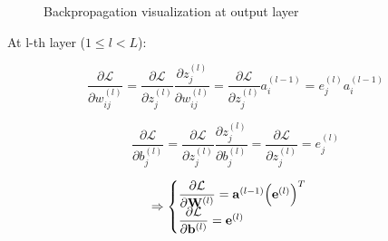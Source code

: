 \documentclass[14pt, a4paper]{article}
\numberwithin{equation}{section}
\numberwithin{algorithm}{section}
\numberwithin{figure}{section}
\begin{document}
\begin{figure}[h!]
{
  }
  \caption{Backpropagation visualization at output layer}
\end{figure}

At l-th layer ($1 \leq l < L$):

\begin{equation}
	\dfrac{\partial \mathcal{L}}{\partial w_{ij}^{(l)}}=\dfrac{\partial \mathcal{L}}{\partial z_j^{(l)}}\dfrac{\partial z_j^{(l)}}{\partial w_{ij}^{(l)}}=\dfrac{\partial \mathcal{L}}{\partial z_j^{(l)}} a_i^{(l-1)}=e_j^{(l)}a_i^{(l-1)}
\end{equation}

\begin{equation}
	\dfrac{\partial \mathcal{L}}{\partial b_j^{(l)}}=\dfrac{\partial \mathcal{L}}{\partial z_j^{(l)}}\dfrac{\partial z_j^{(l)}}{\partial b_j^{(l)}}=\dfrac{\partial \mathcal{L}}{\partial z_j^{(l)}} = e_j^{(l)}
\end{equation}

\begin{equation}
	\Rightarrow \begin{cases} \dfrac{\partial \mathcal{L}}{\partial \bold{W}^{(l)}}=\bold{a}^{(l-1)}\Big(\bold{e}^{(l)}\Big)^T \\ \dfrac{\partial \mathcal{L}}{\partial \bold{b}^{(l)}}=\bold{e}^{(l)} \end{cases}
\end{equation}
\end{document}
